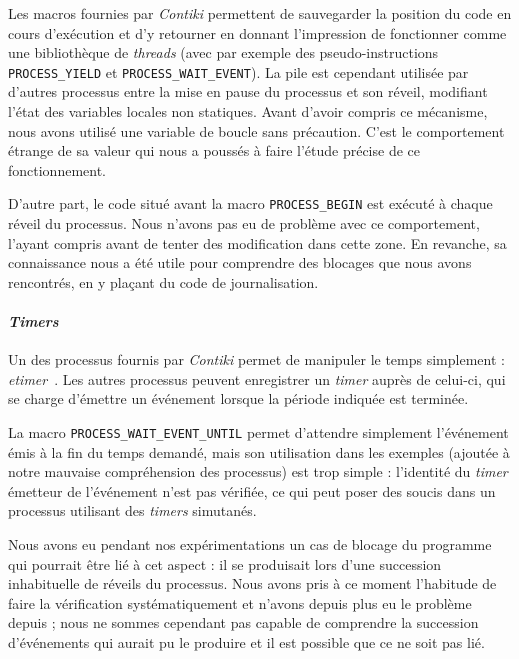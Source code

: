 Les macros fournies par \emph{Contiki} permettent de sauvegarder la position du code en cours d’exécution et d’y retourner en donnant l’impression de fonctionner comme une bibliothèque de \emph{threads} (avec par exemple des pseudo-instructions \texttt{PROCESS\_YIELD} et \texttt{PROCESS\_WAIT\_EVENT}).
La pile est cependant utilisée par d’autres processus entre la mise en pause du processus et son réveil, modifiant l’état des variables locales non statiques.
Avant d’avoir compris ce mécanisme, nous avons utilisé une variable de boucle sans précaution. C’est le comportement étrange de sa valeur qui nous a poussés à faire l’étude précise de ce fonctionnement.
\label{variables-locales}

D’autre part, le code situé avant la macro \texttt{PROCESS\_BEGIN} est exécuté à chaque réveil du processus.
Nous n’avons pas eu de problème avec ce comportement, l’ayant compris avant de tenter des modification dans cette zone.
En revanche, sa connaissance nous a été utile pour comprendre des blocages que nous avons rencontrés, en y plaçant du code de journalisation.

\paragraph{\emph{Timers}}

Un des processus fournis par \emph{Contiki} permet de manipuler le temps simplement : \emph{etimer}~.
Les autres processus peuvent enregistrer un \emph{timer} auprès de celui-ci, qui se charge d’émettre un événement lorsque la période indiquée est terminée.

La macro \texttt{PROCESS\_WAIT\_EVENT\_UNTIL} permet d’attendre simplement l’événement émis à la fin du temps demandé, mais son utilisation dans les exemples (ajoutée à notre mauvaise compréhension des processus) est trop simple : l’identité du \textit{timer} émetteur de l’événement n’est pas vérifiée, ce qui peut poser des soucis dans un processus utilisant des \textit{timers} simutanés.

Nous avons eu pendant nos expérimentations un cas de blocage du programme qui pourrait être lié à cet aspect : il se produisait lors d’une succession inhabituelle de réveils du processus.
Nous avons pris à ce moment l’habitude de faire la vérification systématiquement et n’avons depuis plus eu le problème depuis ; nous ne sommes cependant pas capable de comprendre la succession d’événements qui aurait pu le produire et il est possible que ce ne soit pas lié.

